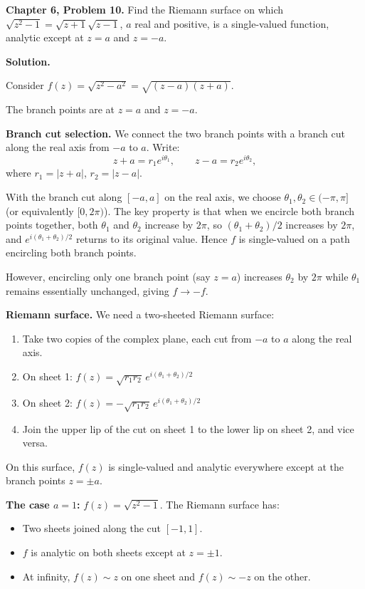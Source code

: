 \documentclass[12pt]{article}
\begin{document}
\textbf{Chapter 6, Problem 10.} Find the Riemann surface on which $\sqrt{z^2 - 1} = \sqrt{z+1}\sqrt{z-1}$, $a$ real and positive, is a single-valued function, analytic except at $z = a$ and $z = -a$.

\bigskip
\textbf{Solution.}

Consider $f(z) = \sqrt{z^2 - a^2} = \sqrt{(z-a)(z+a)}$.

The branch points are at $z = a$ and $z = -a$.

\textbf{Branch cut selection.} We connect the two branch points with a branch cut along the real axis from $-a$ to $a$. Write:
\[
z + a = r_1 e^{i\theta_1}, \qquad z - a = r_2 e^{i\theta_2},
\]
where $r_1 = |z+a|$, $r_2 = |z-a|$.

With the branch cut along $[-a, a]$ on the real axis, we choose $\theta_1, \theta_2 \in (-\pi, \pi]$ (or equivalently $[0, 2\pi)$). The key property is that when we encircle both branch points together, both $\theta_1$ and $\theta_2$ increase by $2\pi$, so $(\theta_1 + \theta_2)/2$ increases by $2\pi$, and $e^{i(\theta_1+\theta_2)/2}$ returns to its original value. Hence $f$ is single-valued on a path encircling both branch points.

However, encircling only one branch point (say $z = a$) increases $\theta_2$ by $2\pi$ while $\theta_1$ remains essentially unchanged, giving $f \to -f$.

\textbf{Riemann surface.} We need a two-sheeted Riemann surface:
\begin{enumerate}
\item Take two copies of the complex plane, each cut from $-a$ to $a$ along the real axis.
\item On sheet 1: $f(z) = \sqrt{r_1 r_2}\, e^{i(\theta_1 + \theta_2)/2}$
\item On sheet 2: $f(z) = -\sqrt{r_1 r_2}\, e^{i(\theta_1 + \theta_2)/2}$
\item Join the upper lip of the cut on sheet 1 to the lower lip on sheet 2, and vice versa.
\end{enumerate}

On this surface, $f(z)$ is single-valued and analytic everywhere except at the branch points $z = \pm a$.

\textbf{The case $a = 1$:} $f(z) = \sqrt{z^2-1}$. The Riemann surface has:
\begin{itemize}
\item Two sheets joined along the cut $[-1, 1]$.
\item $f$ is analytic on both sheets except at $z = \pm 1$.
\item At infinity, $f(z) \sim z$ on one sheet and $f(z) \sim -z$ on the other.
\end{itemize}
\end{document}
